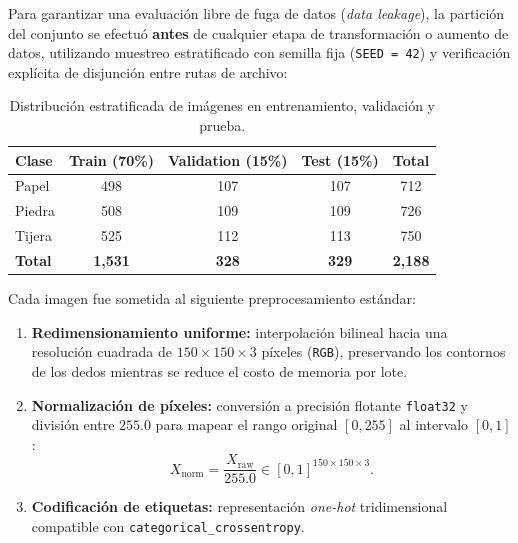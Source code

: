Para garantizar una evaluación libre de fuga de datos (\textit{data leakage}), la partición del conjunto se efectuó \textbf{antes} de cualquier etapa de transformación o aumento de datos, utilizando muestreo estratificado con semilla fija (\texttt{SEED = 42}) y verificación explícita de disjunción entre rutas de archivo:

\begin{table}[H]
    \centering
    \caption{Distribución estratificada de imágenes en entrenamiento, validación y prueba.}
    \label{tab:splits}
    \begin{tabular}{lcccc}
        \toprule
        \textbf{Clase} & \textbf{Train (70\%)} & \textbf{Validation (15\%)} & \textbf{Test (15\%)} & \textbf{Total} \\
        \midrule
        Papel  & 498 & 107 & 107 & 712 \\
        Piedra & 508 & 109 & 109 & 726 \\
        Tijera & 525 & 112 & 113 & 750 \\
        \midrule
        \textbf{Total} & \textbf{1,531} & \textbf{328} & \textbf{329} & \textbf{2,188} \\
        \bottomrule
    \end{tabular}
\end{table}

Cada imagen fue sometida al siguiente preprocesamiento estándar:
\begin{enumerate}
    \item \textbf{Redimensionamiento uniforme:} interpolación bilineal hacia una resolución cuadrada de $150 \times 150 \times 3$ píxeles (\texttt{RGB}), preservando los contornos de los dedos mientras se reduce el costo de memoria por lote.
    \item \textbf{Normalización de píxeles:} conversión a precisión flotante \texttt{float32} y división entre $255.0$ para mapear el rango original $[0, 255]$ al intervalo $[0, 1]$:
    \begin{equation}
        X_{\text{norm}} = \frac{X_{\text{raw}}}{255.0} \in [0, 1]^{150 \times 150 \times 3}.
    \end{equation}
    \item \textbf{Codificación de etiquetas:} representación \textit{one-hot} tridimensional compatible con \texttt{categorical\_crossentropy}.
\end{enumerate}

